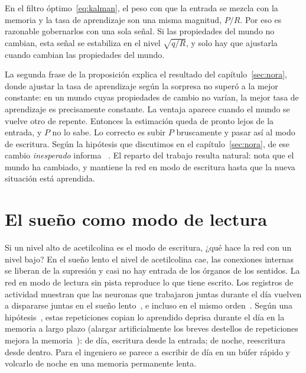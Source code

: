 \begin{keyblock}
\begin{proposition}
\label{prop:kalman}
En el filtro óptimo~\eqref{eq:kalman}, el peso con que la entrada se mezcla con la memoria y la tasa de aprendizaje son una misma magnitud, $P/R$. Por eso es razonable gobernarlos con una sola señal. Si las propiedades del mundo no cambian, esta señal se estabiliza en el nivel $\sqrt{q/R}$, y solo hay que ajustarla cuando cambian las propiedades del mundo.
\end{proposition}
\end{keyblock}

La segunda frase de la proposición explica el resultado del capítulo~\ref{sec:nora}, donde ajustar la tasa de aprendizaje según la sorpresa no superó a la mejor constante: en un mundo cuyas propiedades de cambio no varían, la mejor tasa de aprendizaje es precisamente constante. La ventaja aparece cuando el mundo se vuelve otro de repente. Entonces la estimación queda de pronto lejos de la entrada, y $P$ no lo sabe. Lo correcto es subir $P$ bruscamente y pasar así al modo de escritura. Según la hipótesis que discutimos en el capítulo~\ref{sec:nora}, de ese cambio \emph{inesperado} informa ~\cite{YuDayan2005}. El reparto del trabajo resulta natural:  nota que el mundo ha cambiado, y  mantiene la red en modo de escritura hasta que la nueva situación está aprendida.

\section{El sueño como modo de lectura}

Si un nivel alto de acetilcolina es el modo de escritura, ¿qué hace la red con un nivel bajo? En el sueño lento el nivel de acetilcolina cae, las conexiones internas se liberan de la supresión y casi no hay entrada de los órganos de los sentidos. La red en modo de lectura sin pista reproduce lo que tiene escrito. Los registros de actividad muestran que las neuronas que trabajaron juntas durante el día vuelven a dispararse juntas en el sueño lento~\cite{WilsonMcNaughton1994}, e incluso en el mismo orden~\cite{Skaggs1996}. Según una hipótesis~\cite{Hasselmo1999}, estas repeticiones copian lo aprendido deprisa durante el día en la memoria a largo plazo (alargar artificialmente los breves destellos de repeticiones mejora la memoria~\cite{FernandezRuiz2019}): de día, escritura desde la entrada; de noche, reescritura desde dentro. Para el ingeniero se parece a escribir de día en un búfer rápido y volcarlo de noche en una memoria permanente lenta.

